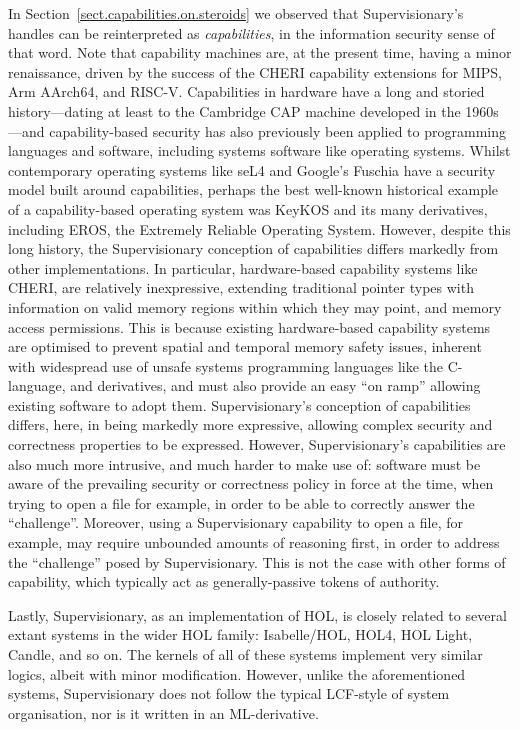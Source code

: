 \documentclass[a4paper, UKenglish, cleveref, autoref, thm-restate, colorlinks]{lipics-v2021}
\begin{document}
In Section~\ref{sect.capabilities.on.steroids} we observed that Supervisionary's handles can be reinterpreted as \emph{capabilities}, in the information security sense of that word.
Note that capability machines are, at the present time, having a minor renaissance, driven by the success of the CHERI capability extensions for MIPS, Arm AArch64, and RISC-V.
Capabilities in hardware have a long and storied history---dating at least to the Cambridge CAP machine developed in the 1960s---and capability-based security has also previously been applied to programming languages and software, including systems software like operating systems.
Whilst contemporary operating systems like seL4 and Google's Fuschia have a security model built around capabilities, perhaps the best well-known historical example of a capability-based operating system was KeyKOS and its many derivatives, including EROS, the Extremely Reliable Operating System.
However, despite this long history, the Supervisionary conception of capabilities differs markedly from other implementations.
In particular, hardware-based capability systems like CHERI, are relatively inexpressive, extending traditional pointer types with information on valid memory regions within which they may point, and memory access permissions.
This is because existing hardware-based capability systems are optimised to prevent spatial and temporal memory safety issues, inherent with widespread use of unsafe systems programming languages like the C-language, and derivatives, and must also provide an easy ``on ramp'' allowing existing software to adopt them.
Supervisionary's conception of capabilities differs, here, in being markedly more expressive, allowing complex security and correctness properties to be expressed.
However, Supervisionary's capabilities are also much more intrusive, and much harder to make use of: software must be aware of the prevailing security or correctness policy in force at the time, when trying to open a file for example, in order to be able to correctly answer the ``challenge''.
Moreover, using a Supervisionary capability to open a file, for example, may require unbounded amounts of reasoning first, in order to address the ``challenge'' posed by Supervisionary.
This is not the case with other forms of capability, which typically act as generally-passive tokens of authority.

Lastly, Supervisionary, as an implementation of HOL, is closely related to several extant systems in the wider HOL family: Isabelle/HOL, HOL4, HOL Light, Candle, and so on.
The kernels of all of these systems implement very similar logics, albeit with minor modification.
However, unlike the aforementioned systems, Supervisionary does not follow the typical LCF-style of system organisation, nor is it written in an ML-derivative.
\end{document}
